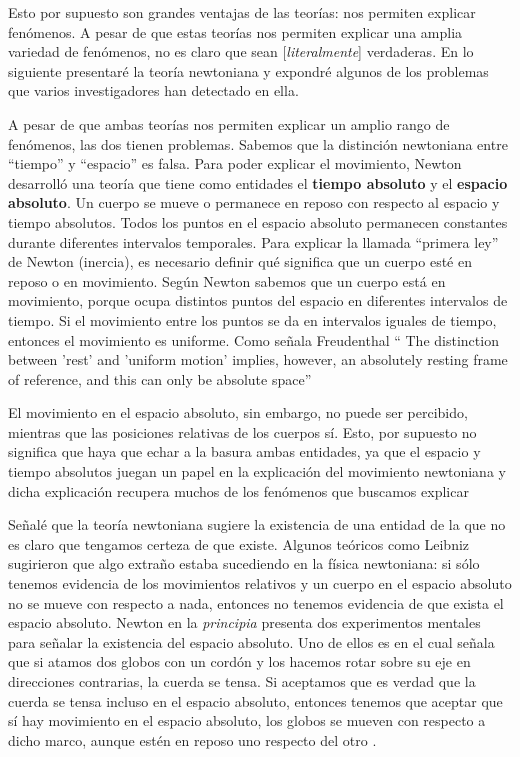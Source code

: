 \documentclass{article}
\begin{document}
Esto por supuesto son grandes ventajas de las teorías: nos permiten explicar fenómenos. A pesar de que estas teorías nos permiten explicar una amplia variedad de fenómenos, no es claro que sean [\textit{literalmente}] verdaderas. En lo siguiente presentaré la teoría newtoniana y expondré algunos de los problemas que varios investigadores han detectado en ella.

A pesar de que ambas teorías nos permiten explicar un amplio rango de fenómenos, las dos tienen problemas. Sabemos que la distinción newtoniana entre ``tiempo'' y ``espacio'' es falsa. Para poder explicar el movimiento, Newton desarrolló una teoría que tiene como entidades el \textbf{tiempo absoluto} y el \textbf{espacio absoluto}. Un cuerpo se mueve o permanece en reposo con respecto al espacio y tiempo absolutos. Todos los puntos en el espacio absoluto permanecen constantes durante diferentes intervalos temporales. Para explicar la llamada ``primera ley''  de Newton (inercia), es necesario definir qué significa que un cuerpo esté en reposo o en movimiento. Según Newton sabemos que un cuerpo está en movimiento, porque ocupa distintos puntos del espacio en diferentes intervalos de tiempo. Si el movimiento entre los puntos se da en intervalos iguales de tiempo, entonces el movimiento es uniforme. Como señala Freudenthal `` The distinction between 'rest' and 'uniform motion' implies, however, an absolutely resting frame of reference, and this can only be absolute space'' \citeyear{Freudenthal1986}

El movimiento en el espacio absoluto, sin embargo, no puede ser percibido, mientras que las posiciones relativas de los cuerpos sí. Esto, por supuesto no significa que haya que echar a la basura ambas entidades, ya que el espacio y tiempo absolutos juegan un papel en la explicación del movimiento newtoniana y dicha explicación recupera muchos de los fenómenos que buscamos explicar 

Señalé que la teoría newtoniana sugiere la existencia de una entidad de la que no es claro que tengamos certeza de que existe. Algunos teóricos como Leibniz sugirieron que algo extraño estaba sucediendo en la física newtoniana: si sólo tenemos evidencia de los movimientos relativos y un cuerpo en el espacio absoluto no se mueve con respecto a nada, entonces no tenemos evidencia de que exista el espacio absoluto. Newton en la \textit{principia} presenta dos experimentos mentales para señalar la existencia del espacio absoluto. Uno de ellos es en el cual señala que si atamos dos globos con un cordón y los hacemos rotar sobre su eje en direcciones contrarias, la cuerda se tensa. Si aceptamos que es verdad que la cuerda se tensa incluso en el espacio absoluto, entonces tenemos que aceptar que sí hay movimiento en el espacio absoluto, los globos se mueven con respecto a dicho marco, aunque estén en reposo uno respecto del otro \cite[pp. 6-12]{book:360820}.
\end{document}
